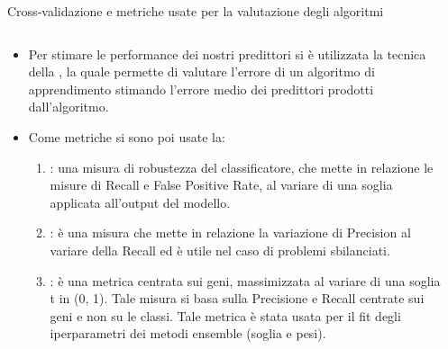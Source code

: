\documentclass[9pt]{beamer}
\begin{document}
\begin{tframe}{Cross-validazione e metriche usate per la valutazione degli algoritmi}
\begin{columns}

    \begin{column}{.65\textwidth}
      \minipage[c][0.4\textheight][s]{\columnwidth}
	   \begin{itemize}	
	  		\item Per stimare le performance dei nostri predittori si è utilizzata la tecnica della , la quale permette di valutare l’errore di un algoritmo di apprendimento stimando l’errore medio dei predittori prodotti  dall’algoritmo. 
	  		\onslide<2->
	  		\item Come metriche si sono poi usate la:
	  		\begin{enumerate}
				\item {}: una misura di robustezza del classificatore,  che mette in relazione le misure di Recall e False Positive Rate, al variare di una soglia applicata all’output del modello.
				\onslide<4->	  			
				\item {}: è una misura che mette in relazione la variazione di Precision al variare della Recall ed è utile nel caso di problemi sbilanciati. 
				\onslide<5->
	  			\item {}: è una metrica centrata sui geni, massimizzata al variare di una soglia t in (0, 1). Tale misura si basa sulla Precisione e Recall centrate sui geni e non su le classi. Tale metrica è stata usata per il fit degli iperparametri dei metodi ensemble (soglia e pesi).
	  		\end{enumerate}
	  \end{itemize}
      \endminipage      
    \end{column}
    
    
    \begin{column}{.35\textwidth}
    \end{column}


\end{columns} 
\end{tframe}
\end{document}

